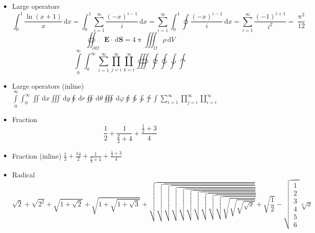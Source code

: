 \documentclass[11pt,fleqn]{article}
\newcommand{\dd}{\,\mathrm{d}}
\begin{document}
\begin{itemize}
  \item Large operators
  \[\int_0^1\frac{\ln (x+1)}{x}\dd{x}=\int_0^1\sum_{i=1}^{\infty}\frac{(-x)^{i-1}}{i}\dd{x}=\sum_{i=1}^{\infty}\int_0^1\oint\frac{(-x)^{i-1}}{i}\dd{x}=\sum_{i=1}^{\infty}\frac{(-1)^{i+1}}{i^2}=\frac{\uppi^2}{12}\]
      \[\oiint_{\partial\Omega}\symbf{E}\cdot\dd{\symbf S}=4\uppi \iiint_{\Omega}\rho\dd{V}\]
        \[
          \int\limits_0^\infty \int_0^\infty
          \sum_{i=1}^\infty \prod_{j=i}^\infty \coprod_{k=i}^\infty
          \oiiint \varointclockwise \ointctrclockwise \awint \intclockwise
        \]

  \item Large operators (inline)
        $ \int\limits_0^\infty \int_0^\infty \iint \dd{x} \iiint \dd{y}
          \oint \dd{r} \oiint \dd{\theta} \oiiint \dd{\varphi}\varointclockwise \ointctrclockwise \awint \intclockwise
          \int\sum_{i=1}^\infty \prod_{j=i}^\infty \coprod_{i=i}^\infty $

  \item Fraction
        \[ \frac{1}{2} + \frac{1}{\frac{2}{3}+4} + \frac{\frac{1}{2}+3}{4} \]

  \item Fraction (inline)
        $ \frac{1}{2} + \frac{1g}{2} + \frac{1}{\frac{2}{3}+4} + \frac{\frac{1}{2}+3}{4} $

  \item Radical
        \[
            \sqrt{2} + \sqrt{2^2} + \sqrt{1+\sqrt{2}} + \sqrt{1+\sqrt{1+\sqrt{3}}}
          + \sqrt{\sqrt{\sqrt{\sqrt{\sqrt{\sqrt{\sqrt{\sqrt{\sqrt{\sqrt{\sqrt{\sqrt{\sqrt{\sqrt{x}}}}}}}}}}}}}} + \sqrt{\frac{1}{2}}-\sqrt{\begin{matrix}
          	1\\2\\3\\4\\5\\6
            \end{matrix}}
            \sqrt[a]{x}
        \]


\end{itemize}
\end{document}
